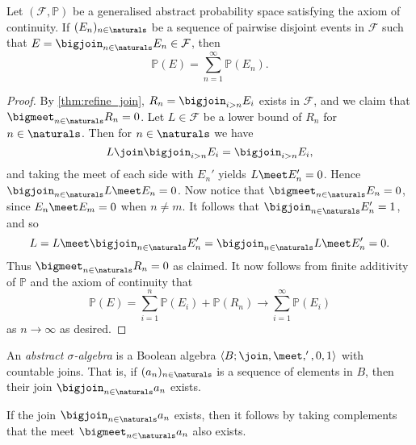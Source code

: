 \documentclass[article, a4paper, 11pt, oneside]{memoir}
\numberwithin{equation}{chapter}
\newcommand{\calF}{\mathcal{F}}
\renewcommand{\P}{\mathbb{P}}
\begin{document}
\begin{proposition}
    Let $(\calF, \P)$ be a generalised abstract probability space satisfying the axiom of continuity. If $(E_n)_{n\in\naturals}$ be a sequence of pairwise disjoint events in $\calF$ such that $E = \bigjoin_{n\in\naturals} E_n \in \calF$, then
    \begin{equation*}
        \P(E)
            = \sum_{n=1}^\infty \P(E_n).
    \end{equation*}
\end{proposition}

\begin{proof}
    By \cref{thm:refine_join}, $R_n = \bigjoin_{i > n} E_i$ exists in $\calF$, and we claim that $\bigmeet_{n\in\naturals} R_n = 0$. Let $L \in \calF$ be a lower bound of $R_n$ for $n \in \naturals$. Then for $n \in \naturals$ we have
    \begin{equation*}
        L \join \bigjoin_{i > n} E_i
            = \bigjoin_{i > n} E_i,
    \end{equation*}
    and taking the meet of each side with $E_n'$ yields $L \meet E_n' = 0$. Hence $\bigjoin_{n\in\naturals} L \meet E_n = 0$. Now notice that $\bigmeet_{n\in\naturals} E_n = 0$, since $E_n \meet E_m = 0$ when $n \neq m$. It follows that $\bigjoin_{n\in\naturals} E_n' = 1$, and so
    \begin{equation*}
        L
            = L \meet \bigjoin_{n\in\naturals} E_n'
            = \bigjoin_{n\in\naturals} L \meet E_n'
            = 0.
    \end{equation*}
    Thus $\bigmeet_{n\in\naturals} R_n = 0$ as claimed. It now follows from finite additivity of $\P$ and the axiom of continuity that
    \begin{equation*}
        \P(E)
            = \sum_{i=1}^n \P(E_i) + \P(R_n)
            \to \sum_{i=1}^\infty \P(E_i)
    \end{equation*}
    as $n \to \infty$ as desired.
\end{proof}


\begin{definition}
    An \emph{abstract $\sigma$-algebra} is a Boolean algebra $\langle B; \join, \meet, ', 0, 1 \rangle$ with countable joins. That is, if $(a_n)_{n\in\naturals}$ is a sequence of elements in $B$, then their join $\bigjoin_{n\in\naturals} a_n$ exists.
\end{definition}
%
If the join $\bigjoin_{n\in\naturals} a_n$ exists, then it follows by taking complements that the meet $\bigmeet_{n\in\naturals} a_n$ also exists.


\nocite{*}

\printbibliography
\end{document}
